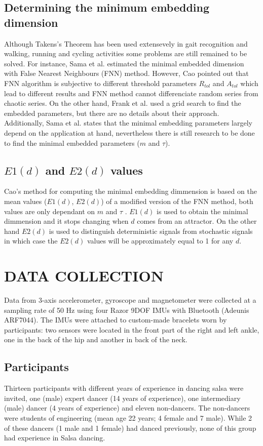 \documentclass{sigchi}
\begin{document}
\subsection{Determining the minimum embedding dimension}
Although Takens's Theorem has been used extensevely in gait recognition and walking, running and cycling 
activities some problems are still remained to be solved.
For instance, Sama et al. \cite{Sama2013} estimated the minimal embedded dimension with False Nearest Neighbours (FNN) method.
However, Cao \cite{Cao1997} pointed out that FNN algorithm is subjective to different threshold parameters 
$R_{tol}$ and $A_{tol}$  which lead to different results and FNN method cannot differenciate random series 
from chaotic series. On the other hand, Frank et al. \cite{Frank2010} used a grid search 
to find the embedded parameters, but there are no details about their approach.
Additionally, Sama et al. \cite{Sama2013} states that the minimal embedding parameters largely depend on the 
application at hand, nevertheless there is still research to be done to find the minimal 
embedded parameters ($m$ and $\tau$).

\subsection{$E1(d)$ and $E2(d)$ values}
Cao's method for computing the minimal embedding dimmension is based on the mean values ($E1(d)$, $E2(d)$) of a
modified version of the FNN method, both values are only dependant on $m$ and $\tau$ \cite{Cao1997}.
$E1(d)$ is used to obtain the minimal dimmension and it stops changing when $d$ comes from an attractor.
On the other hand $E2(d)$ is used to distinguish deterministic signals from stochastic signals 
in which case the $E2(d)$ values will be approximately equal to 1 for any $d$.



\section{DATA COLLECTION}
Data from 3-axis accelerometer, gyroscope and magnetometer were collected at a sampling rate of 50 Hz 
using four Razor 9DOF IMUs with Bluetooth (Adeunis ARF7044). 
The IMUs were attached to custom-made bracelets worn by participants: 
two sensors were located in the front part of the right and left ankle, one in the 
back of the hip and another in back of the neck. 


\subsection{Participants}
Thirteen participants with different years of experience in dancing salsa were invited, one (male) 
expert dancer (14 years of experience), one intermediary (male) dancer (4 years of experience) 
and eleven non-dancers. 
The non-dancers were students of engineering (mean age 22 years; 4 female and 7 male).  
While 2 of these dancers (1 male and 1 female) had danced previously, none of this group had experience 
in Salsa dancing.  
\end{document}
